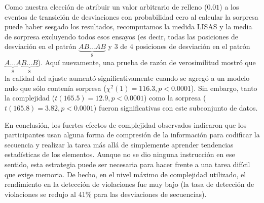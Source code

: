 Como nuestra elección de atribuir un valor arbitrario de relleno ($0.01$) a los eventos de transición de desviaciones con probabilidad cero al calcular la sorpresa puede haber sesgado los resultados, recomputamos la medida LISAS y la media de sorpresa excluyendo todos esos ensayos (es decir, todas las posiciones de desviación en el patrón $\underbrace{AB \dots AB}_8$ y 3 de 4 posiciones de desviación en el patrón $\underbrace{A \dots A}_8\underbrace{B \dots B}_8$). Aquí nuevamente, una prueba de razón de verosimilitud mostró que la calidad del ajuste aumentó significativamente cuando se agregó \mdlbin a un modelo nulo que sólo contenía sorpresa ($\chi^2(1) = 116.3, p < 0.0001$). Sin embargo, tanto la complejidad ($t (165.5) = 12.9, p < 0.0001$) como la sorpresa ($t(165.8) = 3.82, p < 0.0001$) fueron significativas con este subconjunto de datos. 


En conclusión, los fuertes efectos de complejidad observados indicaron que los participantes usan alguna forma de compresión de la información para codificar la secuencia y realizar la tarea más allá de simplemente aprender tendencias estadísticas de los elementos. Aunque no se dio ninguna instrucción en ese sentido, esta estrategia puede ser necesaria para hacer frente a una tarea difícil que exige memoria. De hecho, en el nivel máximo de complejidad utilizado, el rendimiento en la detección de violaciones fue muy bajo (la tasa de detección de violaciones se redujo al 41\% para las desviaciones de secuencias).


